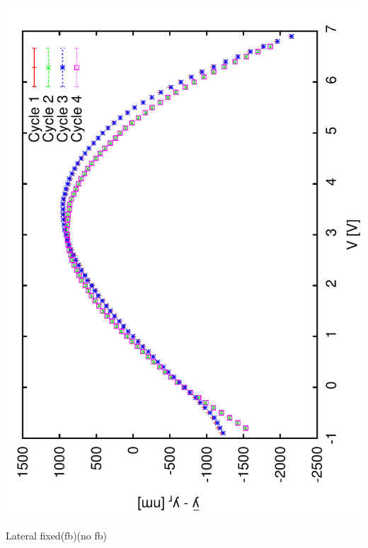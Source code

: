 \documentclass[a4paper,11pt]{book}
\begin{document}
\includegraphics[angle=-90,scale=0.14]{image26e.pdf}\par
Lateral fixed\hspace{1.8cm}(fb)\hspace{3.0cm}(no fb)\par
\end{document}
